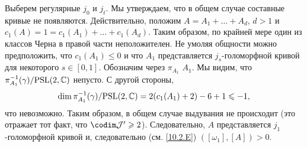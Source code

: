 Выберем регулярные $j_0$ и $j_t$.
Мы утверждаем, что в общем случае составные кривые не появляются.
Действительно, положим $A = A_1 +\dots + A_d$, $d > 1$ и $c_1 (A) = 1 = c_1 (A_1) +\dots + c_1 (A_d)$.
Таким образом, по крайней мере один из классов Черна в правой части неположителен.
Не умоляя общности можно предположить, что $c_1 (A_1) \le 0$ и что $A_1$ представляется $j_s$-голоморфной кривой для некоторого $s \in [0, 1]$.
Обозначим через $\pi_{A_1}$  $A_1$.
Мы видим, что $\pi_{A_1}^{-1} (\gamma)/\mathrm{PSL}(2, \mathbb{C})$ непусто.
С другой стороны, 
\[\dim \pi_{A_1}^{-1} (\gamma)/\mathrm{PSL}(2, \mathbb{C}) = 2(c_1 (A_1) + 2) - 6 + 1 \leqslant -1,\]
что невозможно.
Таким образом, в общем случае выдувания не происходит (это отражает тот факт, что $\codim \mathcal{J}' \ge 2$).
Следовательно, $A$ представляется $j_1$-голоморфной кривой и, следовательно (см. \ref{10.2.E}) $([\omega_1], [A]) > 0$. 
